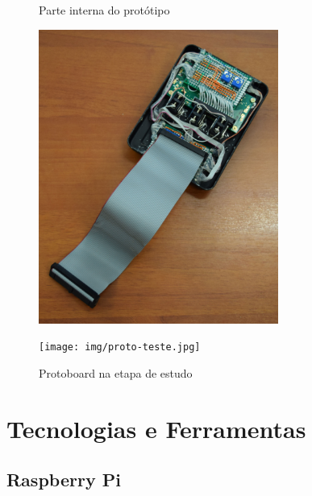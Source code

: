 \documentclass[
		12pt,				%
		openright,			%
		oneside,			%
		a4paper,			%
		chapter=TITLE,		%
		english,			%
		brazil				%
	]{abntex2}
\begin{document}
\begin{figure}[htb]
	\label{teste}
	\centering
 	\begin{minipage}{0.43\textwidth}
		\centering
		\caption{\label{fig:prot-interno}Parte interna do protótipo}
		\includegraphics[width=0.7\textwidth]{img/prot-interno.jpg}
	\end{minipage}
	\hfill
	\begin{minipage}{0.55\textwidth}
		\centering
		\caption{\label{fig:proto-teste}Protoboard na etapa de estudo}
		\texttt{[image: img/proto-teste.jpg]}
	\end{minipage}
\end{figure}


\chapter{Tecnologias e Ferramentas}\label{cap:tecnologias-ferramentas}


\section{Raspberry Pi}\label{sec:rpi-tecnologia}
\end{document}
